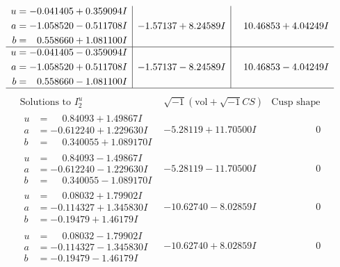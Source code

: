 \documentclass[1p]{elsarticle_modified}
\theoremstyle{definition}
\newcommand{\I}{\sqrt{-1}}
\begin{document}
$$\begin{array}{c|c|c}
\begin{aligned}
u &= -0.041405 + 0.359094 I \\
a &= -1.058520 - 0.511708 I \\
b &= \phantom{-}0.558660 + 1.081100 I\end{aligned}
 & -1.57137 + 8.24589 I & \phantom{-}10.46853 + 4.04249 I \\ \hline\begin{aligned}
u &= -0.041405 - 0.359094 I \\
a &= -1.058520 + 0.511708 I \\
b &= \phantom{-}0.558660 - 1.081100 I\end{aligned}
 & -1.57137 - 8.24589 I & \phantom{-}10.46853 - 4.04249 I\\
 \hline 
 \end{array}$$\newpage$$\begin{array}{c|c|c}  
\text{Solutions to }I^u_{2}& \I (\text{vol} + \sqrt{-1}CS) & \text{Cusp shape}\\
 \hline 
\begin{aligned}
u &= \phantom{-}0.84093 + 1.49867 I \\
a &= -0.612240 + 1.229630 I \\
b &= \phantom{-}0.340055 + 1.089170 I\end{aligned}
 & -5.28119 + 11.70500 I & \phantom{-0.000000 } 0 \\ \hline\begin{aligned}
u &= \phantom{-}0.84093 - 1.49867 I \\
a &= -0.612240 - 1.229630 I \\
b &= \phantom{-}0.340055 - 1.089170 I\end{aligned}
 & -5.28119 - 11.70500 I & \phantom{-0.000000 } 0 \\ \hline\begin{aligned}
u &= \phantom{-}0.08032 + 1.79902 I \\
a &= -0.114327 + 1.345830 I \\
b &= -0.19479 + 1.46179 I\end{aligned}
 & -10.62740 - 8.02859 I & \phantom{-0.000000 } 0 \\ \hline\begin{aligned}
u &= \phantom{-}0.08032 - 1.79902 I \\
a &= -0.114327 - 1.345830 I \\
b &= -0.19479 - 1.46179 I\end{aligned}
 & -10.62740 + 8.02859 I & \phantom{-0.000000 } 0 \\ \hline\begin{aligned}

\end{aligned}
\end{array}$$
\end{document}
